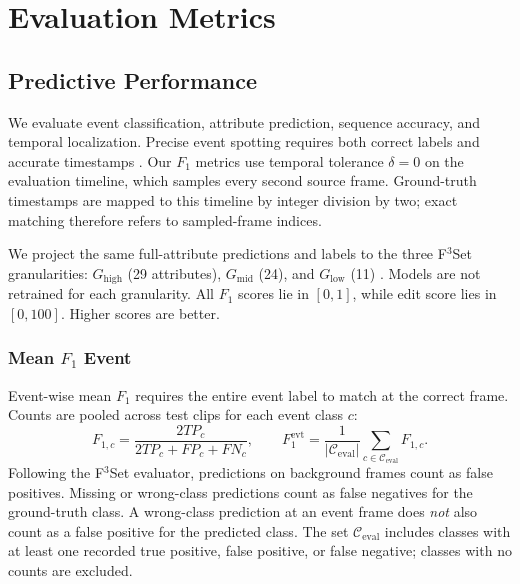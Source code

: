 \section{Evaluation Metrics}
\label{sec:Evaluation Metrics}

\subsection{Predictive Performance}
We evaluate event classification, attribute prediction, sequence accuracy, and temporal localization. Precise event spotting requires both correct labels and accurate timestamps \autocite{hong_spotting_2022}. Our $F_1$ metrics use temporal tolerance $\delta=0$ on the evaluation timeline, which samples every second source frame. Ground-truth timestamps are mapped to this timeline by integer division by two; exact matching therefore refers to sampled-frame indices.

We project the same full-attribute predictions and labels to the three F$^3$Set granularities: $G_{\mathrm{high}}$ (29 attributes), $G_{\mathrm{mid}}$ (24), and $G_{\mathrm{low}}$ (11) \autocite{liu_f3set_2025}. Models are not retrained for each granularity. All $F_1$ scores lie in $[0,1]$, while edit score lies in $[0,100]$. Higher scores are better.

\subsubsection{Mean $F_1$ Event}
Event-wise mean $F_1$ requires the entire event label to match at the correct frame. Counts are pooled across test clips for each event class $c$:
\begin{equation}
    F_{1,c}=\frac{2TP_c}{2TP_c+FP_c+FN_c},\qquad
    F_1^{\mathrm{evt}}=\frac{1}{|\mathcal{C}_{\mathrm{eval}}|}
        \sum_{c\in\mathcal{C}_{\mathrm{eval}}}F_{1,c}.
\end{equation}
Following the F$^3$Set evaluator, predictions on background frames count as false positives. Missing or wrong-class predictions count as false negatives for the ground-truth class. A wrong-class prediction at an event frame does \emph{not} also count as a false positive for the predicted class. The set $\mathcal{C}_{\mathrm{eval}}$ includes classes with at least one recorded true positive, false positive, or false negative; classes with no counts are excluded.

